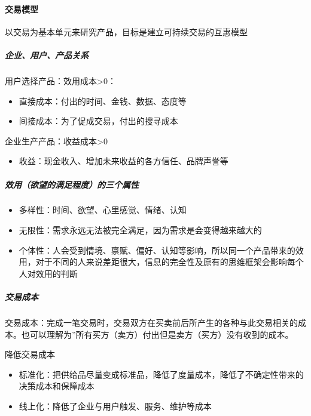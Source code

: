\documentclass[letterpaper,11pt,english]{sphinxmanual}
\begin{document}
\paragraph{交易模型}
\label{\detokenize{chapter_idea/business:id13}}
以交易为基本单元来研究产品，目标是建立可持续交易的互惠模型


\subparagraph{企业、用户、产品关系}
\label{\detokenize{chapter_idea/business:id14}}
用户选择产品：效用\sphinxhyphen{}成本>0：
\begin{itemize}
\item {} 
直接成本：付出的时间、金钱、数据、态度等

\item {} 
间接成本：为了促成交易，付出的搜寻成本

\end{itemize}

企业生产产品：收益\sphinxhyphen{}成本>0
\begin{itemize}
\item {} 
收益：现金收入、增加未来收益的各方信任、品牌声誉等

\end{itemize}


\subparagraph{效用（欲望的满足程度）的三个属性}
\label{\detokenize{chapter_idea/business:id15}}\begin{itemize}
\item {} 
多样性：时间、欲望、心里感觉、情绪、认知

\item {} 
无限性：需求永远无法被完全满足，因为需求是会变得越来越大的

\item {} 
个体性：人会受到情境、禀赋、偏好、认知等影响，所以同一个产品带来的效用，对于不同的人来说差距很大，信息的完全性及原有的思维框架会影响每个人对效用的判断

\end{itemize}


\subparagraph{交易成本}
\label{\detokenize{chapter_idea/business:id16}}
交易成本：完成一笔交易时，交易双方在买卖前后所产生的各种与此交易相关的成本。也可以理解为”所有买方（卖方）付出但是卖方（买方）没有收到的成本。

降低交易成本
\begin{itemize}
\item {} 
标准化：把供给品尽量变成标准品，降低了度量成本，降低了不确定性带来的决策成本和保障成本

\item {} 
线上化：降低了企业与用户触发、服务、维护等成本

\end{itemize}
\end{document}
